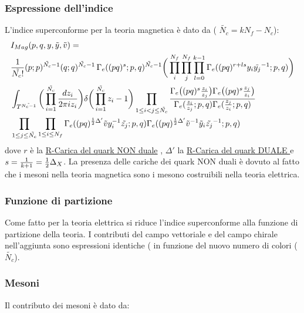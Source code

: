 \documentclass[a4paper,12pt]{article}
\begin{document}
\subsubsection{Espressione dell'indice}
L'indice superconforme per la teoria magnetica è dato da ( $\tilde{N_c} = k N_f - N_c$):
\begin{align*}
&I_{Mag} ( p,q,y,\tilde y,\tilde v) = \\
 & { 1 \over \tilde{N_c !}} (p;p)^{\tilde{N_c}-1} ( q;q)^{\tilde{N_c}-1} \, \Gamma_e( (pq)^s;p,q)^{\tilde{N_c}-1} \bigg( \prod_i^{N_f} \prod_j^{N_f}  \prod_{l=0}^{k-1} \Gamma_e ( (pq)^{r + l s} y_i \tilde{y_j}^{-1}; p ,q) \bigg) \\
&\int_{T^{\tilde{N_c-1}}} \bigg( \prod_{i=1}^{ \tilde{N_c }} { d z_i \over { 2 \pi i z_i} } \bigg) \delta \bigg( \prod_{i=1}^{\tilde{N_c}} z_i - 1 \bigg)
\prod_{ 1 \leq i < j \leq \tilde{N_c}} \frac{ \Gamma_e \big( (pq)^s {z_i \over z_j} \big) \Gamma_e \big( (pq)^s {z_j \over z_i} \big) }{ \Gamma_e( {z_i \over z_j};p,q) \Gamma_e({z_j \over z_i}; p,q)} \\
& \prod_{ 1 \leq j \leq \tilde{N_c}} \prod_{ 1 \leq i \leq N_f} \Gamma_e ( (pq)^{{1 \over 2 } \Delta'} \tilde{v} y_i^{-1} \tilde{z_j} ; p,q)\Gamma_e ( (pq)^{{1 \over 2 } \Delta'} \tilde{v}^{-1} \tilde y_i \tilde{z_j}^{-1} ; p,q)
\end{align*}
dove $r $ è la \underline{R-Carica del quark NON duale} , $\Delta'$ la \underline{R-Carica del quark DUALE } e $ s = \frac{1}{k+1} = {1 \over 2 } \Delta_X$.
La presenza delle cariche dei quark NON duali è dovuto al fatto che i mesoni nella teoria magnetica sono i mesono costruibili nella teoria elettrica.

\subsubsection{Funzione di partizione}
Come fatto per la teoria elettrica si riduce l'indice superconforme alla funzione di partizione della teoria.
I contributi del campo vettoriale e del campo chirale nell'aggiunta sono espressioni identiche ( in funzione del nuovo numero di colori ($\tilde{N_c}$).\\
\subsubsection*{Mesoni}
Il contributo dei mesoni è dato da:
\end{document}
